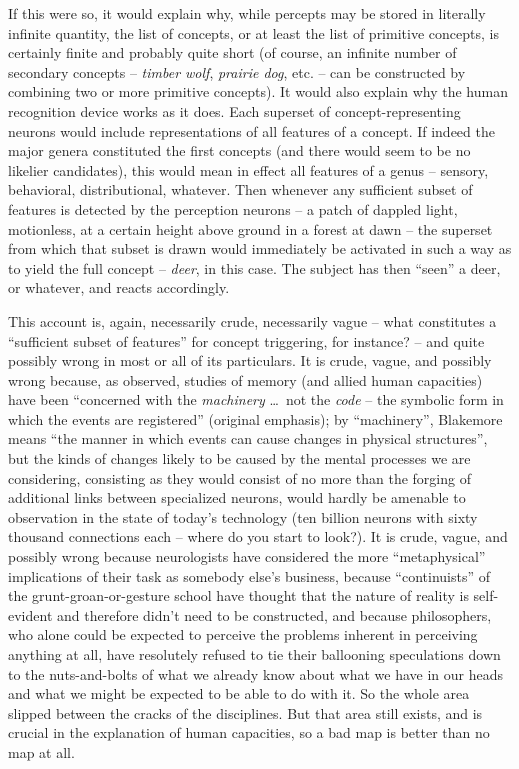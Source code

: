 If this were so, it would explain why, while percepts may be stored in literally infinite quantity, the list of concepts, or at least the list of primitive concepts, is certainly finite and probably quite short (of course, an infinite number of secondary concepts -- \textit{timber wolf}, \textit{prairie dog}, etc. -- can be constructed by combining two or more primitive concepts). It would also explain why the human recognition device works as it does. Each superset of concept-representing neurons would include representations of all features of a concept. If indeed the major genera constituted the first concepts (and there would seem to be no likelier candidates), this would mean in effect all features of a genus -- sensory, behavioral, distributional, whatever. Then whenever any sufficient subset of features is detected by the perception neurons --
a patch of dappled light, motionless, at a certain height above ground in a forest at dawn -- the superset from which that subset is drawn would immediately be activated in such a way as to yield the full concept -- \textit{deer}, in this case. The subject has then ``seen'' a deer, or whatever, and reacts accordingly.

This account is, again, necessarily crude, necessarily vague -- what constitutes a ``sufficient subset of features'' for concept triggering, for instance? -- and quite possibly wrong in most or all of its particulars. It is crude, vague, and possibly wrong because, as \citet{Blakemore1977} observed, studies of memory (and allied human capacities) have been ``concerned with the \textit{machinery} \ldots~not the \textit{code} -- the symbolic form in which the events are registered'' (original emphasis); by ``machinery'', Blakemore means ``the manner in which events can cause changes in physical structures'', but the kinds of changes likely to be caused by the mental processes we are considering, consisting as they would consist of no more than the forging of additional links between specialized neurons, would hardly be amenable to observation in the state of today's technology (ten billion neurons with sixty thousand connections each -- where do you start to look?). It is crude, vague, and possibly wrong because neurologists have considered the more ``metaphysical'' implications of their task as somebody else's business, because ``continuists'' of the grunt-groan-or-gesture school have thought that the nature of reality is self-evident and therefore didn't need to be constructed, and because philosophers, who alone could be expected to perceive the problems inherent in perceiving anything at all, have resolutely refused to tie their ballooning speculations down to the nuts-and-bolts of what we already know about what we have in our heads and what we might be expected to be able to do with it. So the whole area slipped between the cracks of the disciplines. But that area still exists, and is crucial in the explanation of human capacities, so a bad map is better than no map at all.\\\\

